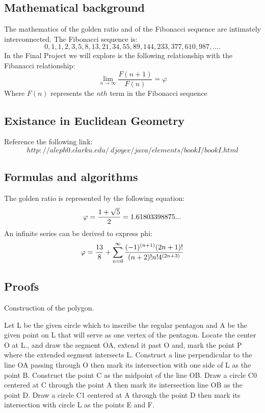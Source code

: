 \documentclass{article}
\begin{document}
\subsection{Mathematical background}

The mathematics of the golden ratio and of the Fibonacci sequence are intimately interconnected. The Fibonacci sequence is:
$$
0, 1, 1, 2, 3, 5, 8, 13, 21, 34, 55, 89, 144, 233, 377, 610, 987, ....
$$
In the Final Project we will explore is the following relationship with the Fibanacci relationship:
$$
\lim_{n\to\infty}\frac{F(n+1)}{F(n)}=\varphi
$$
Where $F(n)$ represents the $nth$ term in the Fibonacci sequence

\subsection{Existance in Euclidean Geometry}

Reference the following link:
$$
http://aleph0.clarku.edu/~djoyce/java/elements/bookI/bookI.html
$$

\subsection{Formulas and algorithms}\label{formulas}

The golden ratio is represented by the following equation:
$$
\varphi = {1+\sqrt{5} \over 2} = 1.61803398875...
$$
An infinite series can be derived to express phi:
$$
\varphi = {{13} \over 8} + \sum_{n=0}^{\infty}\frac{(-1)^{(n+1)}(2n+1)!}{(n+2)!n!4^{(2n+3)}}
$$

\subsection{Proofs}

Construction of the polygon.

Let L be the given circle which to inscribe the regular pentagon and A be the given point on L that will serve as one vertex of the pentagon. Locate the center O at L., and draw the segment OA, extend it past O and, mark the point P where the extended segment intersects L. Construct a line perpendicular to the line OA passing through O then mark its intersection with one side of L as the point B. Construct the point C as the midpoint of the line OB. Draw a circle C0 centered at C through the point A then mark its intersection line OB as the point D. Draw a circle C1 centered at A through the point D then mark its intersection with circle L as the points E and F.
\end{document}
